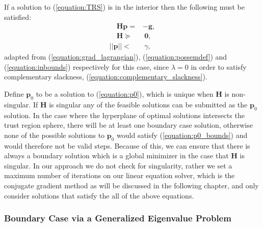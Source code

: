 \documentclass[letterpaper,12pt,titlepage,oneside,final]{book}
\begin{document}
	If a solution to (\ref{equation:TRS}) is in the interior then the following must be satisfied:
	\begin{subequations}
		\begin{align}
		\quad \mathbf{Hp} = & -\mathbf{g}, \label{equation:p0} \\
		\quad \mathbf{H} \succeq & \ \mathbf{0},\label{equation:p0_posdef} \\ 
		||\mathbf{p}|| < & \ \gamma, \label{equation:p0_bounds}  
		\end{align}
	\end{subequations}
	adapted from (\ref{equation:grad_lagrangian}), (\ref{equation:possemdef}) and (\ref{equation:inbounds}) respectively for this case, since $\lambda = 0$ in order to satisfy complementary slackness, (\ref{equation:complementary_slackness}).
	
	Define $\mathbf{p}_{0}$ to be a solution to (\ref{equation:p0}), which is unique when $\mathbf{H}$ is non-singular. If $\mathbf{H}$ is singular any of the feasible solutions can be submitted as the $\mathbf{p}_{0}$ solution. In the case where the hyperplane of optimal solutions intersects the trust region sphere, there will be at least one boundary case solution, otherwise none of the possible solutions to $\mathbf{p}_{0}$ would satisfy (\ref{equation:p0_bounds}) and would therefore not be valid steps. Because of this, we can ensure that there is always a boundary solution which is a global minimizer in the case that $\mathbf{H}$ is singular. In our approach we do not check for singularity, rather we set a maximum number of iterations on our linear equation solver, which is the conjugate gradient method as will be discussed in the following chapter, and only consider solutions that satisfy the all of the above equations. 
	
	\subsubsection{Boundary Case via a Generalized Eigenvalue Problem}
	
\end{document}
